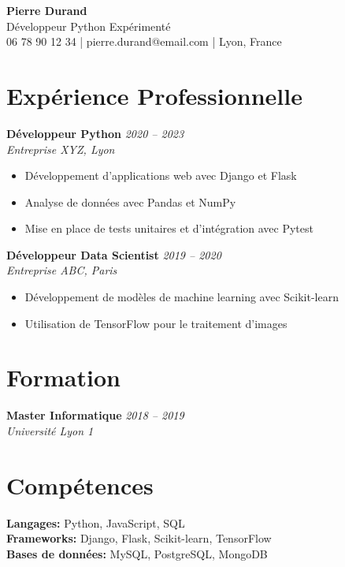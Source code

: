 \documentclass[11pt,a4paper]{article}
\begin{document}
\begin{center}
    {\Huge\textbf{Pierre Durand}}\\[0.4cm]
    {\large Développeur Python Expérimenté}\\[0.3cm]
    06 78 90 12 34 | pierre.durand@email.com | Lyon, France
\end{center}

\section{Expérience Professionnelle}

\textbf{Développeur Python} \hfill \textit{2020 -- 2023}\\
\textit{Entreprise XYZ, Lyon}
\begin{itemize}[noitemsep, topsep=3pt]
    \item Développement d'applications web avec Django et Flask
    \item Analyse de données avec Pandas et NumPy
    \item Mise en place de tests unitaires et d'intégration avec Pytest
\end{itemize}

\textbf{Développeur Data Scientist} \hfill \textit{2019 -- 2020}\\
\textit{Entreprise ABC, Paris}
\begin{itemize}[noitemsep, topsep=3pt]
    \item Développement de modèles de machine learning avec Scikit-learn
    \item Utilisation de TensorFlow pour le traitement d'images
\end{itemize}

\section{Formation}

\textbf{Master Informatique} \hfill \textit{2018 -- 2019}\\
\textit{Université Lyon 1}

\section{Compétences}

\textbf{Langages:} Python, JavaScript, SQL\\
\textbf{Frameworks:} Django, Flask, Scikit-learn, TensorFlow\\
\textbf{Bases de données:} MySQL, PostgreSQL, MongoDB
\end{document}
